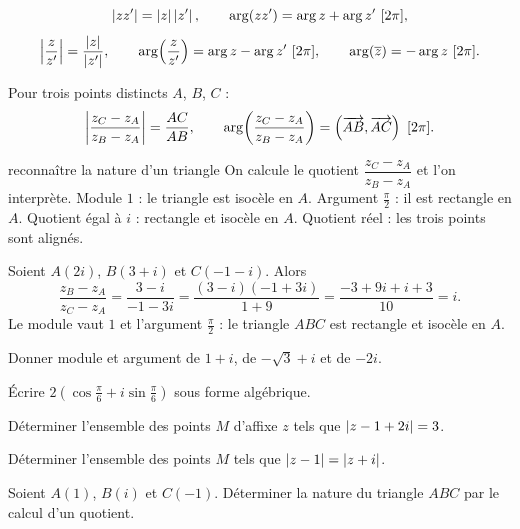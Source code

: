 \begin{propriete}
\[
  \left|zz'\right| = \left|z\right|\left|z'\right|, \qquad
  \arg(zz') = \arg z+\arg z' \ [2\pi],
\]
\[
  \left|\frac{z}{z'}\right| = \frac{\left|z\right|}{\left|z'\right|}, \qquad
  \arg\!\left(\frac{z}{z'}\right) = \arg z-\arg z' \ [2\pi],
  \qquad \arg\!\left(\overline z\right) = -\arg z \ [2\pi].
\]
\end{propriete}

\begin{propriete}
Pour trois points distincts $A$, $B$, $C$ :
\[
  \left|\frac{z_{C}-z_{A}}{z_{B}-z_{A}}\right| = \frac{AC}{AB},
  \qquad
  \arg\!\left(\frac{z_{C}-z_{A}}{z_{B}-z_{A}}\right)
  = \left(\overrightarrow{AB},\overrightarrow{AC}\right) \ [2\pi].
\]
\end{propriete}

\begin{methode}{reconnaître la nature d'un triangle}
On calcule le quotient $\dfrac{z_{C}-z_{A}}{z_{B}-z_{A}}$ et l'on interprète.
Module $1$ : le triangle est isocèle en $A$. Argument $\frac{\pi}{2}$ : il est
rectangle en $A$. Quotient égal à $i$ : rectangle et isocèle en $A$. Quotient
réel : les trois points sont alignés.
\end{methode}

\begin{exemple}
Soient $A(2i)$, $B(3+i)$ et $C(-1-i)$. Alors
\[
  \frac{z_{B}-z_{A}}{z_{C}-z_{A}} = \frac{3-i}{-1-3i}
  = \frac{(3-i)(-1+3i)}{1+9} = \frac{-3+9i+i+3}{10} = i .
\]
Le module vaut $1$ et l'argument $\frac{\pi}{2}$ : le triangle $ABC$ est
rectangle et isocèle en $A$.
\end{exemple}

\begin{entrainement}
\exo[\niveau{1}] Donner module et argument de $1+i$, de $-\sqrt3+i$ et de
$-2i$.

\exo[\niveau{1}] Écrire $2\left(\cos\frac{\pi}{6}+i\sin\frac{\pi}{6}\right)$
sous forme algébrique.

\exo[\niveau{2}] Déterminer l'ensemble des points $M$ d'affixe $z$ tels que
$\left|z-1+2i\right| = 3$.

\exo[\niveau{2}] Déterminer l'ensemble des points $M$ tels que
$\left|z-1\right| = \left|z+i\right|$.

\exo[\niveau{3}] Soient $A(1)$, $B(i)$ et $C(-1)$. Déterminer la nature du
triangle $ABC$ par le calcul d'un quotient.
\end{entrainement}

